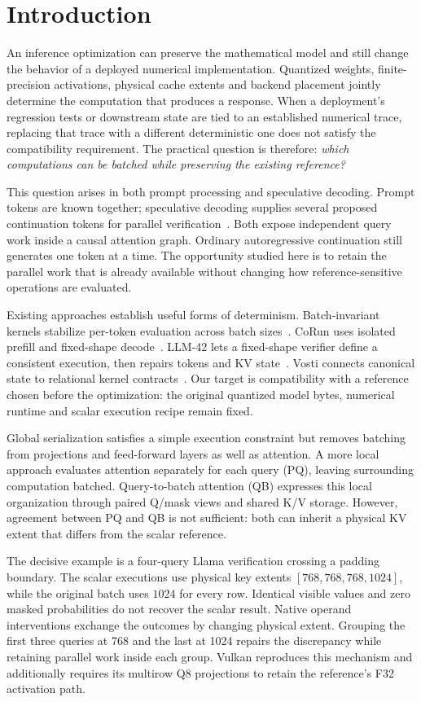 \section{Introduction}
An inference optimization can preserve the mathematical model and still change the behavior of a deployed numerical implementation. Quantized weights, finite-precision activations, physical cache extents and backend placement jointly determine the computation that produces a response. When a deployment's regression tests or downstream state are tied to an established numerical trace, replacing that trace with a different deterministic one does not satisfy the compatibility requirement. The practical question is therefore: \emph{which computations can be batched while preserving the existing reference?}

This question arises in both prompt processing and speculative decoding. Prompt tokens are known together; speculative decoding supplies several proposed continuation tokens for parallel verification~\cite{leviathan2023,chen2023}. Both expose independent query work inside a causal attention graph. Ordinary autoregressive continuation still generates one token at a time. The opportunity studied here is to retain the parallel work that is already available without changing how reference-sensitive operations are evaluated.

Existing approaches establish useful forms of determinism. Batch-invariant kernels stabilize per-token evaluation across batch sizes~\cite{thinkingmachines}. CoRun uses isolated prefill and fixed-shape decode~\cite{corun}. LLM-42 lets a fixed-shape verifier define a consistent execution, then repairs tokens and KV state~\cite{llm42}. Vosti connects canonical state to relational kernel contracts~\cite{vosti,vosticontract}. Our target is compatibility with a reference chosen before the optimization: the original quantized model bytes, numerical runtime and scalar execution recipe remain fixed.

Global serialization satisfies a simple execution constraint but removes batching from projections and feed-forward layers as well as attention. A more local approach evaluates attention separately for each query (PQ), leaving surrounding computation batched. Query-to-batch attention (QB) expresses this local organization through paired Q/mask views and shared K/V storage. However, agreement between PQ and QB is not sufficient: both can inherit a physical KV extent that differs from the scalar reference.

The decisive example is a four-query Llama verification crossing a padding boundary. The scalar executions use physical key extents $[768,768,768,1024]$, while the original batch uses $1024$ for every row. Identical visible values and zero masked probabilities do not recover the scalar result. Native operand interventions exchange the outcomes by changing physical extent. Grouping the first three queries at 768 and the last at 1024 repairs the discrepancy while retaining parallel work inside each group. Vulkan reproduces this mechanism and additionally requires its multirow Q8 projections to retain the reference's F32 activation path.

